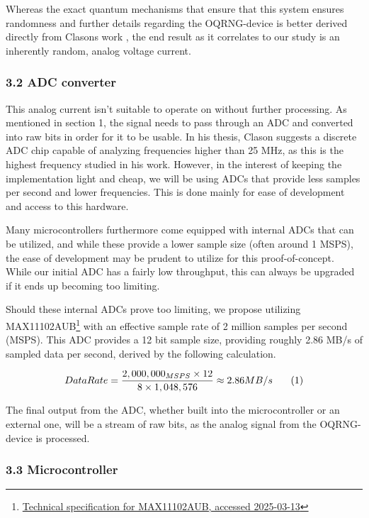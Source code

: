 Whereas the exact quantum mechanisms that ensure that this system ensures randomness and further details regarding the OQRNG-device is better derived directly from Clasons work \cite{Clason2023}, the end result as it correlates to our study is an inherently random, analog voltage current.

\subsubsection{3.2 ADC converter}\label{adc-converter}

This analog current isn't suitable to operate on without further processing. As mentioned in section 1, the signal needs to pass through an ADC and converted into raw bits in order for it to be usable. In his thesis, Clason \cite{Clason2023} suggests a discrete ADC chip capable of analyzing frequencies higher than 25 MHz, as this is the highest frequency studied in his work. However, in the interest of keeping the implementation light and cheap, we will be using ADCs that provide less samples per second and lower frequencies. This is done mainly for ease of development and access to this hardware.

Many microcontrollers furthermore come equipped with internal ADCs that can be utilized, and while these provide a lower sample size (often around 1 MSPS), the ease of development may be prudent to utilize for this proof-of-concept. While our initial ADC has a fairly low throughput, this can always be upgraded if it ends up becoming too limiting.

Should these internal ADCs prove too limiting, we propose utilizing MAX11102AUB\footnote{\href{https://www.farnell.com/datasheets/1913106.pdf}{Technical specification for MAX11102AUB, accessed 2025-03-13}} with an effective sample rate of 2 million samples per second (MSPS). This ADC provides a 12 bit sample size, providing roughly 2.86 MB/s of sampled data per second, derived by the following calculation.

\[
Data Rate = \frac{2,000,000_{MSPS} \times 12}{8 \times 1,048,576} \approx 2.86 MB/s \text{\phantom{123} (1)}
\]

The final output from the ADC, whether built into the microcontroller or an external one, will be a stream of raw bits, as the analog signal from the OQRNG-device is processed.

\subsubsection{3.3 Microcontroller}\label{microcontroller}

